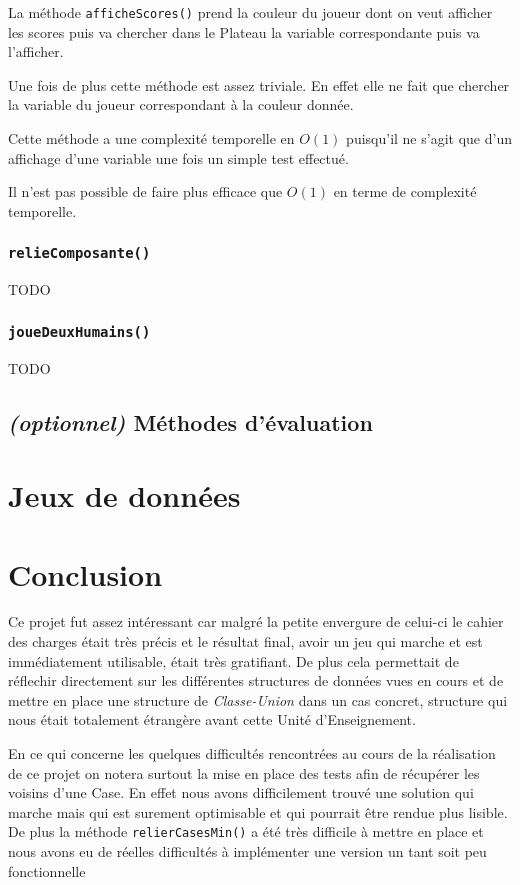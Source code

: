 \documentclass{article}
\newcommand{\info}{\texttt}
\begin{document}
                La méthode \info{afficheScores()} prend la couleur du joueur dont on veut afficher les scores puis va chercher dans le Plateau la variable correspondante puis va l'afficher.
                
                Une fois de plus cette méthode est assez triviale. En effet elle ne fait que chercher la variable du joueur correspondant à la couleur donnée.
                
                Cette méthode a une complexité temporelle en $O(1)$ puisqu'il ne s'agit que d'un affichage d'une variable une fois un simple test effectué.
                
                Il n'est pas possible de faire plus efficace que $O(1)$ en terme de complexité temporelle.
                
            \subsubsection{\info{relieComposante()}}
                
                TODO
                
            \subsubsection{\info{joueDeuxHumains()}}
            
                TODO

    \subsection{\emph{(optionnel)} Méthodes d'évaluation}

\section{Jeux de données}

\section{Conclusion}

    Ce projet fut assez intéressant car malgré la petite envergure de celui-ci le cahier des charges était très précis et le résultat final, avoir un jeu qui marche et est immédiatement utilisable, était très gratifiant. De plus cela permettait de réflechir directement sur les différentes structures de données vues en cours et de mettre en place une structure de \emph{Classe-Union} dans un cas concret, structure qui nous était totalement étrangère avant cette Unité d'Enseignement.
    
    En ce qui concerne les quelques difficultés rencontrées au cours de la réalisation de ce projet on notera surtout la mise en place des tests afin de récupérer les voisins d'une Case. En effet nous avons difficilement trouvé une solution qui marche mais qui est surement optimisable et qui pourrait être rendue plus lisible. De plus la méthode \info{relierCasesMin()} a été très difficile à mettre en place et nous avons eu de réelles difficultés à implémenter une version un tant soit peu fonctionnelle
\end{document}
